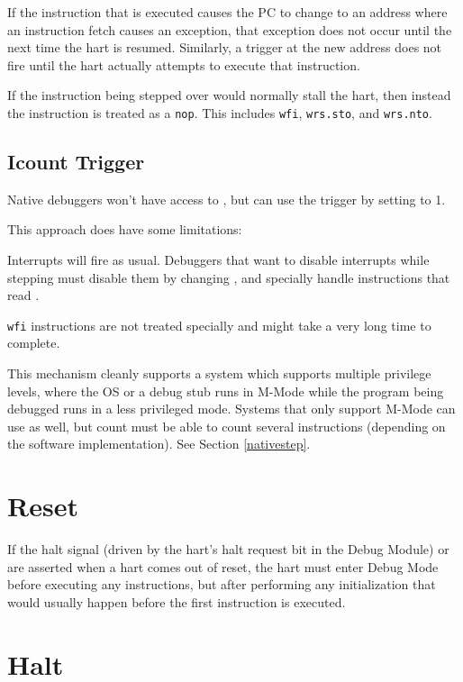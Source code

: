 If the instruction that is executed causes the PC to change to an address where
an instruction fetch causes an exception, that exception does not occur until
the next time the hart is resumed. Similarly, a trigger at the new address does
not fire until the hart actually attempts to execute that instruction.

If the instruction being stepped over would normally stall the hart, then
instead the instruction is treated as a {\tt nop}. This includes {\tt wfi},
{\tt wrs.sto}, and {\tt wrs.nto}.

\subsection{Icount Trigger}

Native debuggers won't have access to \RcsrDcsr, but can use the \RcsrIcount
trigger by setting \FcsrIcountCount to 1.

\begin{steps}{This approach does have some limitations:}
    \item Interrupts will fire as usual. Debuggers that want to disable
        interrupts while stepping must disable them by changing \Rmstatus, and
        specially handle instructions that read \Rmstatus.
    \item {\tt wfi} instructions are not treated specially and might take a
        very long time to complete.
\end{steps}

This mechanism cleanly supports a system which supports multiple privilege
levels, where the OS or a debug stub runs in M-Mode while the program being
debugged runs in a less privileged mode. Systems that only support M-Mode can
use \RcsrIcount as well, but count must be able to count several instructions
(depending on the software implementation). See Section \ref{nativestep}.

\section{Reset}

If the halt signal (driven by the hart's halt request bit in the Debug Module)
or \Fresethaltreq are asserted when a hart comes out of reset, the hart must
enter Debug Mode before executing any instructions, but after performing any
initialization that would usually happen before the first instruction is
executed.

\section{Halt}

